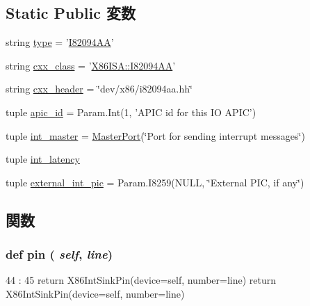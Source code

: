 \subsection*{Static Public 変数}
\begin{DoxyCompactItemize}
\item 
string \hyperlink{classI82094AA_1_1I82094AA_acce15679d830831b0bbe8ebc2a60b2ca}{type} = '\hyperlink{classI82094AA_1_1I82094AA}{I82094AA}'
\item 
string \hyperlink{classI82094AA_1_1I82094AA_a58cd55cd4023648e138237cfc0822ae3}{cxx\_\-class} = '\hyperlink{classX86ISA_1_1I82094AA}{X86ISA::I82094AA}'
\item 
string \hyperlink{classI82094AA_1_1I82094AA_a17da7064bc5c518791f0c891eff05fda}{cxx\_\-header} = \char`\"{}dev/x86/i82094aa.hh\char`\"{}
\item 
tuple \hyperlink{classI82094AA_1_1I82094AA_a30a6ed207c29d3ce4a8cf2fe480703c0}{apic\_\-id} = Param.Int(1, 'APIC id for this IO APIC')
\item 
tuple \hyperlink{classI82094AA_1_1I82094AA_a45501c166fdfc0ea01a04909a5afa425}{int\_\-master} = \hyperlink{classm5_1_1params_1_1MasterPort}{MasterPort}(\char`\"{}Port for sending interrupt messages\char`\"{})
\item 
tuple \hyperlink{classI82094AA_1_1I82094AA_a4843e32273ec8c1b9da3ce36ac4cd439}{int\_\-latency}
\item 
tuple \hyperlink{classI82094AA_1_1I82094AA_aee9353b680fda255a9ad7d73d433e271}{external\_\-int\_\-pic} = Param.I8259(NULL, \char`\"{}External PIC, if any\char`\"{})
\end{DoxyCompactItemize}


\subsection{関数}
\hypertarget{classI82094AA_1_1I82094AA_a55935323323b227bf5734e0fea2cc88f}{
\subsubsection[{pin}]{\setlength{\rightskip}{0pt plus 5cm}def pin ( {\em self}, \/   {\em line})}}
\label{classI82094AA_1_1I82094AA_a55935323323b227bf5734e0fea2cc88f}



\begin{DoxyCode}
44                        :
45         return X86IntSinkPin(device=self, number=line)
        return X86IntSinkPin(device=self, number=line)
\end{DoxyCode}


